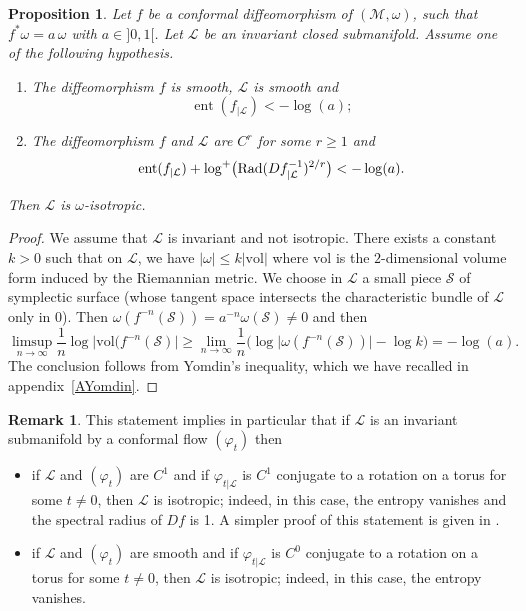 \documentclass[JEP,XML,SOM,Unicode,published]{cedram}
\newtheorem{proposition}{Proposition}
\theoremstyle{definition}
\newtheorem{remark}[theorem]{Remark}
\def\cL{{\mathcal L}}
\def\cM{{\mathcal M}}
\def\cS{{\mathcal S}}
\DeclareMathOperator{\ent}{ent}
\begin{document}
\begin{proposition}\label{PYomdin}
Let $f$ be a conformal diffeomorphism of $(\cM, \omega)$, \ie such that $f^*\omega=a\,\omega$ with $a\in{}]0, 1[$. Let ${\cL}$ be an invariant closed submanifold. Assume one of the following hypothesis.
\begin{enumerate}
\item The diffeomorphism $f$ is smooth, $\cL$ is smooth and\vspace*{-3pt}
\[
\ent(f_{|{\cL}}) < - \log(a);
\]
\item The diffeomorphism $f$ and $\cL$ are $C^r$ for some $r\geq 1$ and\vspace*{-3pt}
\[
\ent(f_{|{\cL}}) + \log^+\bigl(\text{\rm Rad} (Df^{-1}_{|{\cL}})^{2/r}\bigr) < -\log(a).
\]
\end{enumerate}
Then ${\cL}$ is $\omega$-isotropic.
\end{proposition}

\begin{proof}
We assume that $\cL$ is invariant and not isotropic. There exists a constant $k>0$ such that on $\cL$, we have $\vert\omega\vert\leq k\vert \mathrm{vol}\vert$ where $\mathrm{vol}$ is the $2$\nobreakdash-dimensional volume form induced by the Riemannian metric. We choose in $\cL$ a small piece $\cS$ of symplectic surface (whose tangent space intersects the characteristic bundle of $\cL$ only in $0$). Then $\omega(f^{-n}(\cS))=a^{-n}\omega(\cS)\not=0$ and then
\[
\limsup_{n\to \infty} \frac{1}{n}\log\Big\vert \mathrm{vol}(f^{-n}
(\cS)\Big\vert\geq \lim_{n\to\infty}\frac{1}{n}\big(\log\vert \omega(f^{-n}(\cS))\vert-\log k\big)=-\log(a).
\]
The conclusion follows from Yomdin's inequality, which we have recalled in appendix~\ref{AYomdin}.
\end{proof}

\begin{remark}
This statement implies in particular that if $\cL$ is an invariant submanifold by a conformal flow $(\varphi_t)$ then
\begin{itemize}
\item if $\cL$ and $(\varphi_t)$ are $C^1$ and if $\varphi_{t|\cL}$ is $C^1$ conjugate to a rotation on a torus for some $t\not=0$, then $\cL$ is isotropic; indeed, in this case, the entropy vanishes and the spectral radius of $Df$ is 1. A simpler proof of this statement is given in \cite{CaCeLlA2013}.
\item if $\cL$ and $(\varphi_t)$ are smooth and if $\varphi_{t|\cL}$ is $C^0$ conjugate to a rotation on a torus for some $t\not=0$, then $\cL$ is isotropic; indeed, in this case, the entropy vanishes.
\end{itemize}
\end{remark}
\end{document}
